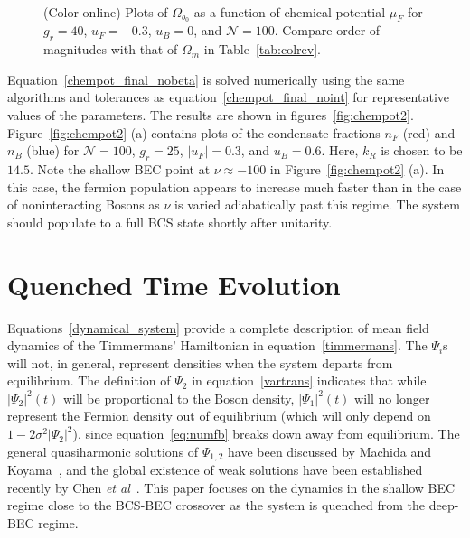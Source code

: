 \documentclass[a4paper,10pt]{article}
\begin{document}
\pagebreak
\begin{figure}[h!bt]
\ 
\caption{(Color online) Plots of $\Omega_{b_0}$ as a function of chemical potential $\mu_F$ for $g_r=40$, $u_F=-0.3$, $u_B=0$, and $\mathcal{N}=100$. Compare order of magnitudes with that of $\Omega_m$ in Table~\ref{tab:colrev}.}
\label{fig:omega}
\end{figure}
Equation~\ref{chempot_final_nobeta} is solved numerically using the same algorithms and tolerances as equation~\ref{chempot_final_noint} for representative values of the parameters. The results are shown in figures~\ref{fig:chempot2}. Figure~\ref{fig:chempot2} (a) contains plots of the condensate fractions $n_F$ (red) and $n_B$ (blue) for $\mathcal{N}=100$, $g_r = 25$, $|u_F| = 0.3$, and $u_B = 0.6$. Here, $k_R$ is chosen to be $14.5$. Note the shallow BEC point at $\nu \approx -100$ in Figure~\ref{fig:chempot2} (a). In this case, the fermion population appears to increase much faster than in the case of noninteracting Bosons as $\nu$ is varied adiabatically past this regime. The system should populate to a full BCS state shortly after unitarity.
\section{Quenched Time Evolution}
\label{sec:quench}
Equations~\ref{dynamical_system} provide a complete description of mean field dynamics of the Timmermans' Hamiltonian in equation~\ref{timmermans}. The $\Psi_i$s will not, in general, represent densities when the system departs from equilibrium. The definition of $\Psi_2$ in equation~\ref{vartrans} indicates that  while $|\Psi_2|^2(t)$ will be proportional to the Boson density, $|\Psi_1|^2(t)$ will no longer represent the Fermion density out of equilibrium (which will only depend on $1-2\sigma^2|\Psi_2|^2$), since equation~\ref{eq:numfb} breaks down away from equilibrium. The general quasiharmonic solutions of $\Psi_{1,2}$ have been discussed by Machida and Koyama~\cite{machida:dynamics}, and the global existence of weak solutions have been established recently by Chen \textit{et al}~\cite{chen:tdglsoln}. This paper focuses on the dynamics in the shallow BEC regime close to the BCS-BEC crossover as the system is quenched from the deep-BEC regime. 
\end{document}
